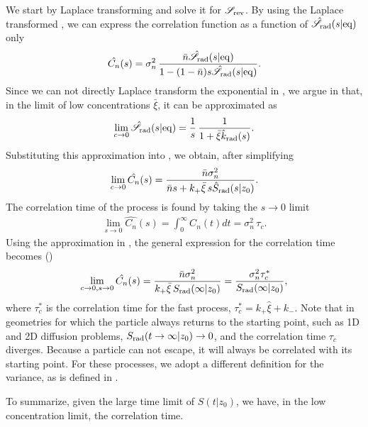 We start by Laplace transforming  and solve it for $\mathscr{S}_{\rm rev}$. By using the Laplace transformed , we can express the correlation function as a function of $\hat{\mathscr{S}}_{\rm rad}(s|{\rm eq})$ only
\begin{equation}
 \hat{C_n}(s) = \sigma_n^2 \, \frac{\bar{n} \hat{\mathscr{S}}_{\rm rad}(s|{\rm eq})}{1-(1-\bar{n})s\hat{\mathscr{S}}_{\rm rad}(s|{\rm eq})}.
 \elabel{LapCorr}
\end{equation}
Since we can not directly Laplace transform the exponential in , we argue in  that, in the limit of low concentrations $\bar{\xi}$, it can be approximated as
\begin{equation}
 \lim_{c\to0} \hat{\mathscr{S}}_{\rm rad}(s|{\rm eq}) = \frac{1}{s}  \, \frac{1}{ 1 + \bar{\xi} \hat{k}_{\rm rad}(s)}.
 \elabel{Seq_approx}
\end{equation}
Substituting this approximation into , we obtain, after simplifying
\begin{equation}
 \lim_{c \to 0} \hat{C_n}(s) = \frac{\bar{n} \sigma_n^2}{\bar{n} s + k_+ \bar{\xi} \, s \hat{S}_{\rm rad}(s|z_0)}.
 \elabel{Corr_approx}
\end{equation}
The correlation time of the process is found by taking the $s \to 0$ limit
\begin{eqnarray}
 \lim_{s \to 0} \hat{C_n}(s) = \int_0^\infty C_n(t) dt = \sigma_n^2 \, \tau_c.
\end{eqnarray}
Using the approximation in , the general expression for the correlation time becomes ()
\begin{equation}
 \lim_{c \to 0, s \to 0} \hat{C_n}(s) = \frac{\bar{n} \sigma_n^2}{k_+ \bar{\xi} \, S_{\rm rad}(\infty|z_0)} = \frac{\sigma_n^2 \tau_c^*}{S_{\rm rad}(\infty|z_0)},
 \elabel{CT1}
\end{equation}
where $\tau_c^*$ is the correlation time for the fast process, $\tau_c^* = k_+ \hat{\xi} + k_-$. Note that in geometries for which the particle always returns to the starting point, such as 1D and 2D diffusion problems, $S_{\rm rad}(t\to\infty|z_0)\to0$, and the correlation time $\tau_c$ diverges. Because a particle can not escape, it will always be correlated with its starting point. For these processes, we adopt a different definition for the variance, as is defined in .

To summarize, given the large time limit of $S(t|z_0)$, we have, in the low concentration limit, the correlation time.


